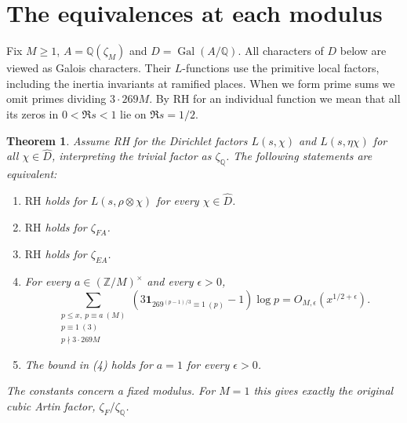 \documentclass[11pt]{article}
\newtheorem{theorem}{Theorem}
\newcommand{\Q}{\mathbb Q}
\newcommand{\Gal}{\operatorname{Gal}}
\newcommand{\RH}{\mathrm{RH}}
\begin{document}
\section{The equivalences at each modulus}
Fix $M\ge1$, $A=\Q(\zeta_M)$ and $D=\Gal(A/\Q)$. All characters of $D$
below are viewed as Galois characters. Their $L$-functions use the
primitive local factors, including the inertia invariants at ramified
places. When we form prime sums we omit primes dividing $3\cdot269M$.
By RH for an individual function we mean that all its zeros in
$0<\Re s<1$ lie on $\Re s=1/2$.

\begin{theorem}\label{t:first}
Assume RH for the Dirichlet factors $L(s,\chi)$ and $L(s,\eta\chi)$
for all $\chi\in\widehat D$, interpreting the trivial factor as
$\zeta_{\Q}$. The following statements are equivalent:
\begin{enumerate}
\item $\RH$ holds for $L(s,\rho\otimes\chi)$ for every $\chi\in\widehat D$.
\item $\RH$ holds for $\zeta_{FA}$.
\item $\RH$ holds for $\zeta_{EA}$.
\item For every $a\in(\mathbb Z/M)^\times$ and every $\epsilon>0$,
\[
 \sum_{\substack{p\le x,\ p\equiv a\ (M)\\p\equiv1\ (3)\\p\nmid3\cdot269M}}
       \left(3\mathbf1_{269^{(p-1)/3}\equiv1\ (p)}-1\right)\log p
       =O_{M,\epsilon}(x^{1/2+\epsilon}).
\]
\item The bound in (4) holds for $a=1$ for every $\epsilon>0$.
\end{enumerate}
The constants concern a fixed modulus. For $M=1$ this gives exactly
the original cubic Artin factor, $\zeta_F/\zeta_{\Q}$.
\end{theorem}
\end{document}
